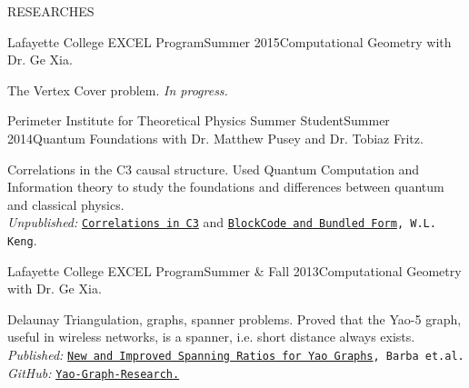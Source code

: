 \documentclass{resume} %
\begin{document}
\begin{rSection}{RESEARCHES}

\begin{rSubsection}{Lafayette College EXCEL Program}{Summer 2015}{Computational Geometry with Dr. Ge Xia.}{}
\item The Vertex Cover problem. {\em In progress.}
\end{rSubsection}


\begin{rSubsection}{Perimeter Institute for Theoretical Physics Summer Student}{Summer 2014}{Quantum Foundations with Dr. Matthew Pusey and Dr. Tobiaz Fritz.}{}
\item Correlations in the C3 causal structure. Used Quantum Computation and Information theory to study the foundations and differences between quantum and classical physics. \\
{\em Unpublished:} {\tt \href{https://github.com/kengz/Quantum-Foundations-Correlations/blob/master/Keng%20Correlations%20in%20C3.pdf}{Correlations in C3}} and {\tt \href{https://github.com/kengz/Quantum-Foundations-Correlations/blob/master/Keng%20blockcode.pdf}{BlockCode and Bundled Form}, W.L. Keng}.
\end{rSubsection}


\begin{rSubsection}{Lafayette College EXCEL Program}{Summer \& Fall 2013}{Computational Geometry with Dr. Ge Xia.}{}
\item Delaunay Triangulation, graphs, spanner problems. Proved that the Yao-5 graph, useful in wireless networks, is a spanner, i.e. short distance always exists.\\
{\em Published:} {\tt \href{http://arxiv.org/abs/1307.5829}{New and Improved Spanning Ratios for Yao Graphs}, Barba et.al.}\\
{\em GitHub:} {\tt \href{https://github.com/kengz/Yao-Graph-Research}{Yao-Graph-Research.}}
\end{rSubsection}


\end{rSection}


\end{document}
